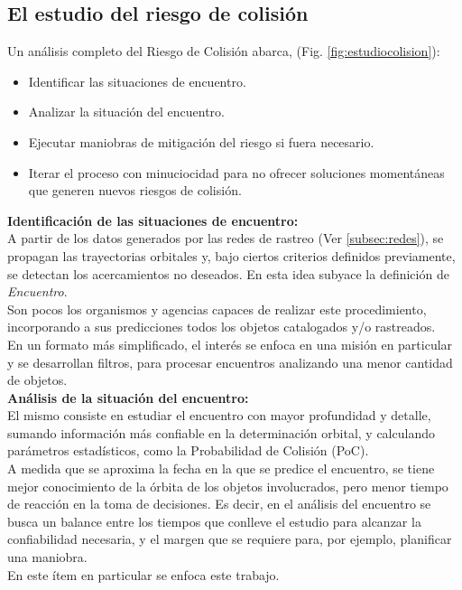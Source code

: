 \subsection{El estudio del riesgo de colisi\'on}\label{subsec:estudiocolision}

Un an\'alisis completo del Riesgo de Colisi\'on abarca, (Fig. \ref{fig:estudiocolision}):

\begin{itemize}
\setlength{\itemsep}{0pt}
\item Identificar las situaciones de encuentro.
\item Analizar la situaci\'on del encuentro.
\item Ejecutar maniobras de mitigaci\'on del riesgo si fuera necesario.
\item Iterar el proceso con minuciocidad para no ofrecer soluciones moment\'aneas que generen nuevos riesgos de colisi\'on.
\end{itemize}

{\bf{Identificaci\'on de las situaciones de encuentro:}}\\
A partir de los datos generados por las redes de rastreo (Ver \ref{subsec:redes}), se propagan las trayectorias orbitales y, bajo ciertos criterios definidos previamente, se detectan los acercamientos no deseados. En esta idea subyace la definici\'on de {\it{Encuentro}}.\\
Son pocos los organismos y agencias capaces de realizar este procedimiento, incorporando a sus predicciones todos los objetos catalogados y/o rastreados.\\
En un formato m\'as simplificado, el inter\'es se enfoca en una misi\'on en particular y se desarrollan filtros, para procesar encuentros analizando una menor cantidad de objetos.\\


{\bf{An\'alisis de la situaci\'on del encuentro: }}\\
El mismo consiste en estudiar el encuentro con mayor profundidad y detalle, sumando informaci\'on m\'as confiable en la determinaci\'on orbital, y calculando par\'ametros estad\'isticos, como la Probabilidad de Colisi\'on (PoC).\\
A medida que se aproxima la fecha en la que se predice el encuentro, se tiene mejor conocimiento de la \'orbita de los objetos involucrados, pero menor tiempo de reacci\'on en la toma de decisiones. Es decir, en el an\'alisis del encuentro se busca un balance entre los tiempos que conlleve el estudio para alcanzar la confiabilidad necesaria, y el margen que se requiere para, por ejemplo, planificar una maniobra.\\
En este \'item en particular se enfoca este trabajo.\\

